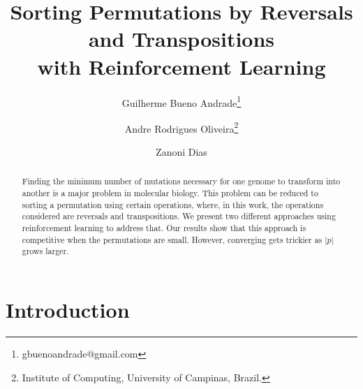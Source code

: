 \documentclass[11pt,twoside]{article}
\begin{document}


%



\TRMakeCover

\pagestyle{myheadings}

\title{Sorting Permutations by Reversals and Transpositions\\ with Reinforcement Learning}

\newcommand*\samethanks[1][\value{footnote}]{\footnotemark[#1]}
\author{Guilherme Bueno Andrade\thanks{gbuenoandrade@gmail.com} \and
Andre Rodrigues Oliveira\thanks{Institute of Computing, University of Campinas, Brazil.} \and Zanoni Dias\samethanks}

\date{}

\maketitle


\begin{abstract} 

Finding the minimum number of mutations necessary for one genome to transform into another is a major problem in molecular biology. This problem can be reduced to sorting a permutation using certain operations, where, in this work, the operations considered are reversals and transpositions. We present two different approaches using reinforcement learning to address that. Our results show that this approach is competitive when the permutations are small. However, converging gets trickier as $|p|$ grows larger.

\end{abstract}

\section{Introduction}
\end{document}
